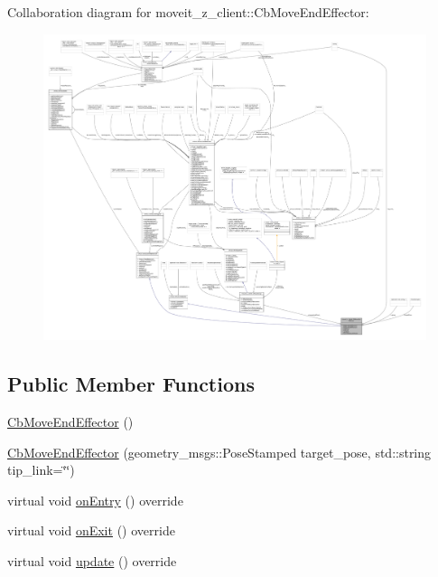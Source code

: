 Collaboration diagram for moveit\+\_\+z\+\_\+client\+:\+:Cb\+Move\+End\+Effector\+:
\nopagebreak
\begin{figure}[H]
\begin{center}
\leavevmode
\includegraphics[width=350pt]{classmoveit__z__client_1_1CbMoveEndEffector__coll__graph}
\end{center}
\end{figure}
\subsection*{Public Member Functions}
\begin{DoxyCompactItemize}
\item 
\hyperlink{classmoveit__z__client_1_1CbMoveEndEffector_acd25310b5088e3eeaa75220d283546e8}{Cb\+Move\+End\+Effector} ()
\item 
\hyperlink{classmoveit__z__client_1_1CbMoveEndEffector_a688d63425a7a67c3f26d1ae90733ccb1}{Cb\+Move\+End\+Effector} (geometry\+\_\+msgs\+::\+Pose\+Stamped target\+\_\+pose, std\+::string tip\+\_\+link=\char`\"{}\char`\"{})
\item 
virtual void \hyperlink{classmoveit__z__client_1_1CbMoveEndEffector_a5306018b432c9d8f8a31823f6b317d84}{on\+Entry} () override
\item 
virtual void \hyperlink{classmoveit__z__client_1_1CbMoveEndEffector_af3fdc6c596da7792cfc9bbef13cb02fc}{on\+Exit} () override
\item 
virtual void \hyperlink{classmoveit__z__client_1_1CbMoveEndEffector_a09d13b5736a13a811f474b48c6ad43cf}{update} () override
\end{DoxyCompactItemize}
